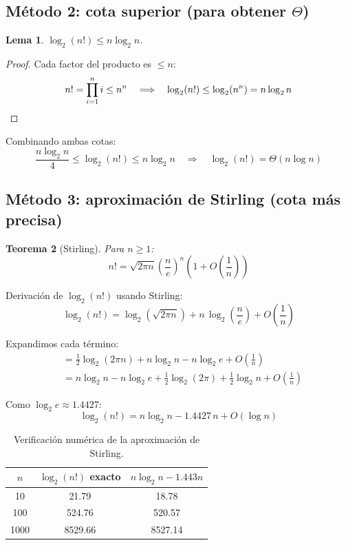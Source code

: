 \documentclass[11pt, letterpaper]{article}
\theoremstyle{definition}
\theoremstyle{plain}
\newtheorem{theorem}{Teorema}[section]
\newtheorem{lemma}[theorem]{Lema}
\theoremstyle{remark}
\begin{document}
\subsection{Método 2: cota superior (para obtener $\Theta$)}

\begin{lemma}\label{lem:logfact-upper}
$\log_2(n!) \leq n \log_2 n$.
\end{lemma}

\begin{proof}
Cada factor del producto es $\leq n$:
\[
  n! = \prod_{i=1}^{n} i \leq n^n
  \quad\Longrightarrow\quad
  \log_2(n!) \leq \log_2(n^n) = n \log_2 n \qedhere
\]
\end{proof}

Combinando ambas cotas:
\[
  \frac{n \log_2 n}{4} \leq \log_2(n!) \leq n \log_2 n
  \quad\Longrightarrow\quad
  \log_2(n!) = \Theta(n \log n)
\]

\subsection{Método 3: aproximación de Stirling (cota más precisa)}

\begin{theorem}[Stirling]
Para $n \geq 1$:
\[
  n! = \sqrt{2\pi n}\left(\frac{n}{e}\right)^{\!n}
  \left(1 + O\!\left(\frac{1}{n}\right)\right)
\]
\end{theorem}

Derivación de $\log_2(n!)$ usando Stirling:
\[
  \log_2(n!)
  = \log_2\!\left(\sqrt{2\pi n}\right)
  + n\,\log_2\!\left(\frac{n}{e}\right)
  + O\!\left(\frac{1}{n}\right)
\]

Expandimos cada término:
\begin{align*}
  &= \frac{1}{2}\log_2(2\pi n) + n\log_2 n - n\log_2 e
    + O\!\left(\frac{1}{n}\right) \\
  &= n\log_2 n - n\log_2 e + \frac{1}{2}\log_2(2\pi)
    + \frac{1}{2}\log_2 n + O\!\left(\frac{1}{n}\right)
\end{align*}

Como $\log_2 e \approx 1.4427$:
\[
  \log_2(n!) = n\log_2 n - 1.4427\,n + O(\log n)
\]

\begin{table}[h]
\centering
\caption{Verificación numérica de la aproximación de Stirling.}
\begin{tabular}{ccc}
\toprule
$n$ & $\log_2(n!)$ exacto & $n\log_2 n - 1.443n$ \\
\midrule
10   & 21.79   & 18.78  \\
100  & 524.76  & 520.57 \\
1000 & 8529.66 & 8527.14 \\
\bottomrule
\end{tabular}
\end{table}
\end{document}
